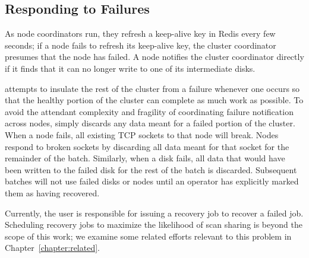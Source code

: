 \subsection{Responding to Failures}
\label{sec:fault_response}

As node coordinators run, they refresh a keep-alive key in Redis every few
seconds; if a node fails to refresh its keep-alive key, the cluster coordinator
presumes that the node has failed. A node notifies the cluster coordinator
directly if it finds that it can no longer write to one of its intermediate
disks.

\themis attempts to insulate the rest of the cluster from a failure whenever
one occurs so that the healthy portion of the cluster can complete as much work
as possible. To avoid the attendant complexity and fragility of coordinating
failure notification across nodes, \themis simply discards any data meant for a
failed portion of the cluster. When a node fails, all existing TCP sockets to
that node will break. Nodes respond to broken sockets by discarding all data
meant for that socket for the remainder of the batch. Similarly, when a disk
fails, all data that would have been written to the failed disk for the rest of
the batch is discarded. Subsequent batches will not use failed disks or nodes
until an operator has explicitly marked them as having recovered.

Currently, the user is responsible for issuing a recovery job to recover a
failed job. Scheduling recovery jobs to maximize the likelihood of scan sharing
is beyond the scope of this work; we examine some related efforts relevant to
this problem in Chapter~\ref{chapter:related}.
